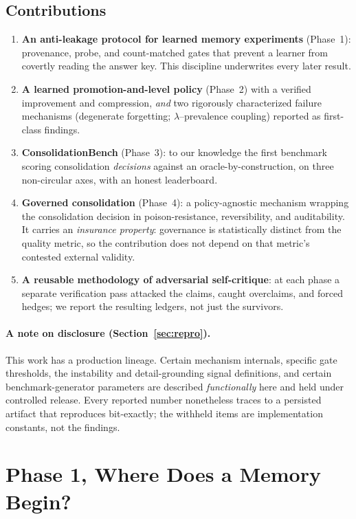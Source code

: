 \documentclass[11pt]{article}
\newcommand{\bench}{ConsolidationBench}
\begin{document}
\subsection{Contributions}
\begin{enumerate}
\item \textbf{An anti-leakage protocol for learned memory experiments} (Phase~1):
provenance, probe, and count-matched gates that prevent a learner from covertly
reading the answer key. This discipline underwrites every later result.
\item \textbf{A learned promotion-and-level policy} (Phase~2) with a verified
improvement and compression, \emph{and} two rigorously characterized failure
mechanisms (degenerate forgetting; $\lambda$--prevalence coupling) reported as
first-class findings.
\item \textbf{\bench{}} (Phase~3): to our knowledge the first benchmark scoring
consolidation \emph{decisions} against an oracle-by-construction, on three
non-circular axes, with an honest leaderboard.
\item \textbf{Governed consolidation} (Phase~4): a policy-agnostic mechanism wrapping
the consolidation decision in poison-resistance, reversibility, and auditability.
It carries an \emph{insurance property}: governance is statistically distinct from the
quality metric, so the contribution does not depend on that metric's contested
external validity.
\item \textbf{A reusable methodology of adversarial self-critique}: at each phase a
separate verification pass attacked the claims, caught overclaims, and forced
hedges; we report the resulting ledgers, not just the survivors.
\end{enumerate}

\paragraph{A note on disclosure (Section~\ref{sec:repro}).} This work has a
production lineage. Certain mechanism internals, specific gate thresholds, the
instability and detail-grounding signal definitions, and certain benchmark-generator
parameters are described \emph{functionally} here and held under controlled release.
Every reported number nonetheless traces to a persisted artifact that reproduces
bit-exactly; the withheld items are implementation constants, not the findings.

\section{Phase 1, Where Does a Memory Begin?}
\label{sec:p1}
\end{document}
